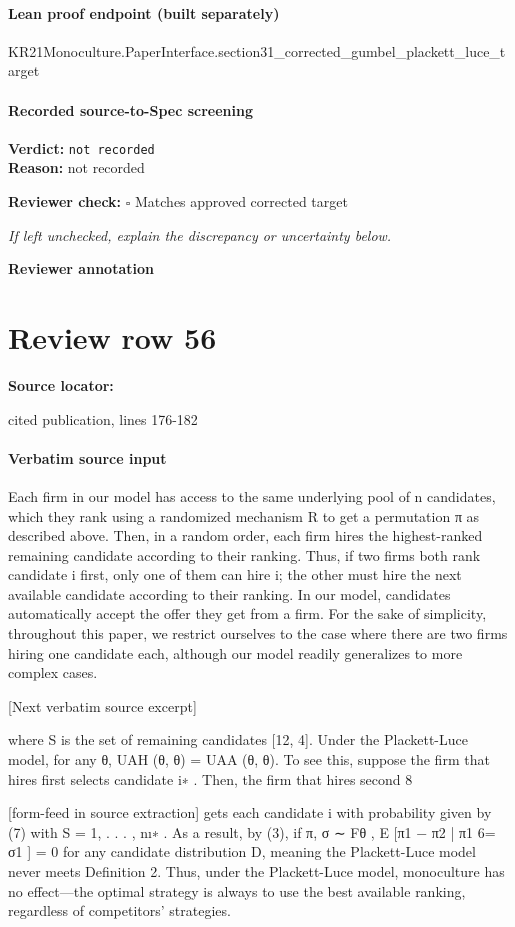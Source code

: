 \documentclass[10pt]{article}
\newcommand{\reviewerbox}{%
  \par\noindent\fbox{\parbox{0.96\linewidth}{\rule{0pt}{0.38in}}}\par
}
\newcommand{\reviewmatch}[1]{%
  \par\noindent\textbf{Reviewer check:} $\square$\; #1\par
  \noindent\emph{If left unchecked, explain the discrepancy or uncertainty below.}\par
}
\begin{document}
\paragraph{Lean proof endpoint (built separately)}\begin{ReviewVerbatim}
KR21Monoculture.PaperInterface.section31_corrected_gumbel_plackett_luce_target
\end{ReviewVerbatim}

\paragraph{Recorded source-to-Spec screening}
\textbf{Verdict:} \texttt{not recorded}
\\
\textbf{Reason:} not recorded
\reviewmatch{Matches approved corrected target}
\noindent\textbf{Reviewer annotation}\par
\reviewerbox
\clearpage
\hypertarget{source-claim-e12ec3045f35c0cc}{}
\section*{Review row 56}
\textbf{Source locator:} {\footnotesize\raggedright cited publication, lines 176-\allowbreak{}182\par}
\paragraph{Verbatim source input}
\begin{ReviewVerbatim}
Each firm in our model has access to the same underlying pool of n candidates, which they rank using
a randomized mechanism R to get a permutation π as described above. Then, in a random order, each
firm hires the highest-ranked remaining candidate according to their ranking. Thus, if two firms both rank
candidate i first, only one of them can hire i; the other must hire the next available candidate according to
their ranking. In our model, candidates automatically accept the offer they get from a firm. For the sake
of simplicity, throughout this paper, we restrict ourselves to the case where there are two firms hiring one
candidate each, although our model readily generalizes to more complex cases.

[Next verbatim source excerpt]

where S is the set of remaining candidates [12, 4]. Under the Plackett-Luce model, for any θ, UAH (θ, θ) =
UAA (θ, θ). To see this, suppose the firm that hires first selects candidate i∗ . Then, the firm that hires second
8


[form-feed in source extraction]
gets each candidate i with probability given by (7) with S = {1, . . . , n}\i∗ . As a result, by (3), if π, σ ∼ Fθ ,
E [π1 − π2 | π1 6= σ1 ] = 0
for any candidate distribution D, meaning the Plackett-Luce model never meets Definition 2. Thus, under
the Plackett-Luce model, monoculture has no effect—the optimal strategy is always to use the best available
ranking, regardless of competitors’ strategies.
\end{ReviewVerbatim}
\end{document}
